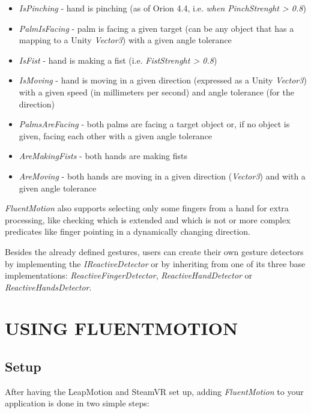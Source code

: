 \documentclass{sigchi}
\def\fluentmotion{\textit{FluentMotion}}
\def\leap{LeapMotion}
\def\steamvr{SteamVR}
\begin{document}
\begin{itemize}
  \item \textit{IsPinching} - hand is pinching (as of Orion 4.4, i.e. \textit{when PinchStrenght > 0.8})
  \item \textit{PalmIsFacing} - palm is facing a given target (can be any object that has a mapping to a Unity \textit{Vector3}) with a given angle tolerance
  \item  \textit{IsFist} - hand is making a fist (i.e. \textit{FistStrenght > 0.8})
  \item \textit{IsMoving} - hand is moving in a given direction (expressed as a Unity \textit{Vector3}) with a given speed (in millimeters per second) and angle tolerance (for the direction) 
  \item \textit{PalmsAreFacing} - both palms are facing a target object or, if no object is given, facing each other with a given angle tolerance
  \item \textit{AreMakingFists} - both hands are making fists
  \item \textit{AreMoving} - both hands are moving in a given direction (\textit{Vector3}) and with a given angle tolerance
\end{itemize}

\fluentmotion{} also supports selecting only some fingers from a hand for extra processing, like checking which is extended and which is not or more complex predicates like finger pointing in a dynamically changing direction.

Besides the already defined gestures, users can create their own gesture detectors by implementing the \textit{IReactiveDetector} or by inheriting from one of its three base implementations: \textit{ReactiveFingerDetector}, \textit{ReactiveHandDetector} or \textit{ReactiveHandsDetector}.

\section{USING FLUENTMOTION}

\subsection{Setup}
After having the \leap{} and \steamvr{} set up, adding \fluentmotion{} to your application is done in two simple steps:
\end{document}
